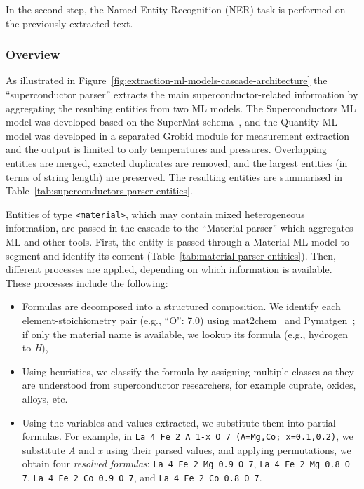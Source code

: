 \documentclass[]{interact}
\theoremstyle{plain}%
\theoremstyle{definition}
\theoremstyle{remark}
\begin{document}
In the second step, the Named Entity Recognition (NER) task is performed on the previously extracted text.

\subsubsection{Overview}

As illustrated in Figure~\ref{fig:extraction-ml-models-cascade-architecture} the ``superconductor parser'' extracts the main superconductor-related information by aggregating the resulting entities from two ML models.
The Superconductors ML model was developed based on the SuperMat schema~\cite{foppiano2021supermat}, and the Quantity ML model was developed in a separated Grobid module for measurement extraction~\cite{foppiano2019quantities} and the output is limited to only temperatures and pressures.
Overlapping entities are merged, exacted duplicates are removed, and the largest entities (in terms of string length) are preserved.
The resulting entities are summarised in Table~\ref{tab:superconductors-parser-entities}.

Entities of type \texttt{<material>}, which may contain mixed heterogeneous information, are passed in the cascade to the ``Material parser'' which aggregates ML and other tools.
First, the entity is passed through a Material ML model to segment and identify its content (Table~\ref{tab:material-parser-entities}).
Then, different processes are applied, depending on which information is available. 
These processes include the following:
\begin{itemize}
    \item Formulas are decomposed into a structured composition. We identify each element-stoichiometry pair (e.g., ``O'': 7.0) using mat2chem~\cite{kononova_text-mined_2019} and Pymatgen~\cite{Ong2013}; if only the material name is available, we lookup its formula (e.g., hydrogen to \textit{H}),
    \item Using heuristics, we classify the formula by assigning multiple classes as they are understood from superconductor researchers, for example cuprate, oxides, alloys, etc.
    \item Using the variables and values extracted, we substitute them into partial formulas. For example, in \texttt{La 4 Fe 2 A 1-x O 7 (A=Mg,Co; x=0.1,0.2)}, we substitute \textit{A} and \textit{x} using their parsed values, and applying permutations, we obtain four \textit{resolved formulas}: \texttt{La 4 Fe 2 Mg 0.9 O 7}, \texttt{La 4 Fe 2 Mg 0.8 O 7}, \texttt{La 4 Fe 2 Co 0.9 O 7}, and \texttt{La 4 Fe 2 Co 0.8 O 7}.
\end{itemize}
\end{document}
